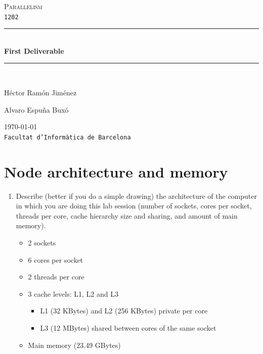 \documentclass[a4paper,11pt]{article}
\newcommand{\assignatura}{Parallelism}
\newcommand{\titol}{First Deliverable}
\newcommand{\Pautor}{Héctor Ramón Jiménez}
\newcommand{\Sautor}{Alvaro Espuña Buxó}
\newcommand{\HRule}{\rule{\linewidth}{0.5mm}}
\newcounter{ProblemCounter}
\newcommand{\question}{%
  \setcounter{enumi}{\value{ProblemCounter}}%
  \stepcounter{ProblemCounter}%
}
\newcommand{\answer}[1]{
  {\bf {#1}}
}
\begin{document}
\begin{titlepage}
  \begin{center}
    \textsc{\Large \assignatura}\\
    \texttt{1202}\\[1.5cm]
    \HRule \\[0.4cm]
     { \huge \bfseries \titol \\[0.4cm] }
    \HRule \\[2.5cm]
    \begin{minipage}{0.4\textwidth}
      \begin{flushleft}
        \large \Pautor
      \end{flushleft}
    \end{minipage}
    \begin{minipage}{0.4\textwidth}
      \begin{flushright}
        \large \Sautor
      \end{flushright}
    \end{minipage}

    \vfill
    {\large \today} \\
    {\large \texttt{Facultat d'Informàtica de Barcelona}}
  \end{center}
\end{titlepage}

\section*{Node architecture and memory}
\begin{enumerate}
  \question \item Describe (better if you do a simple drawing) the
  architecture of the computer in which you are doing this lab session
  (number of sockets, cores per socket, threads per core, cache
  hierarchy size and sharing, and amount of main memory).
  
  \answer{
    \begin{itemize}
      \item 2 sockets
      \item 6 cores per socket
      \item 2 threads per core
      \item 3 cache levels: L1, L2 and L3
      \begin{itemize}
        \item L1 (32 KBytes) and L2 (256 KBytes) private per core
        \item L3 (12 MBytes) shared between cores of the same socket
      \end{itemize}
      \item Main memory (23.49 GBytes)
    \end{itemize}
  }
\end{enumerate}
\end{document}
